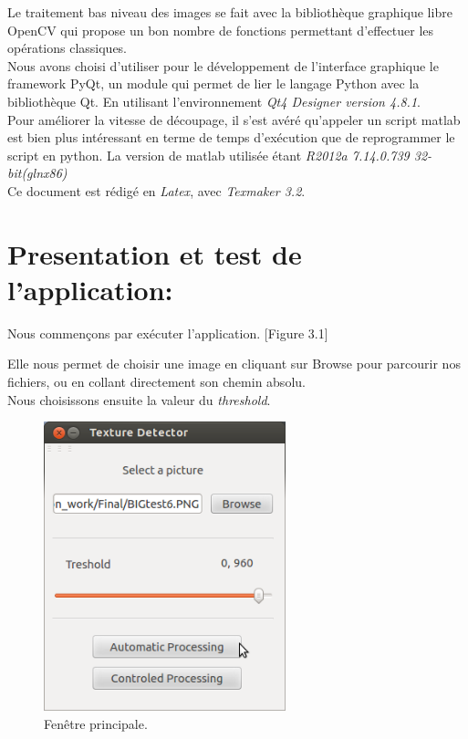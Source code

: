 \indent Le traitement bas niveau des images se fait avec la bibliothèque graphique libre OpenCV qui propose un bon nombre de fonctions permettant d'effectuer les opérations classiques.\\

\indent Nous avons choisi d'utiliser pour le développement de l'interface graphique le framework PyQt, un module qui permet de lier le langage Python avec la bibliothèque Qt. En utilisant l'environnement \textit{Qt4 Designer version 4.8.1}.\\

Pour améliorer la vitesse de découpage, il s'est avéré qu'appeler un script matlab est bien plus intéressant en terme de temps d’exécution que de reprogrammer le script en python. La version de matlab utilisée étant \textit{R2012a 7.14.0.739 32-bit(glnx86)} \\

Ce document est rédigé en \textit{Latex}, avec \textit{Texmaker 3.2}.

\section{Presentation et test de l'application:}

Nous commençons par exécuter l'application. [Figure 3.1]

Elle nous permet de choisir une image en cliquant sur Browse pour parcourir nos fichiers, ou en collant directement son chemin absolu.\\
Nous choisissons ensuite la valeur du \textit{threshold}.

\begin{figure}[H]
	\centering
		\includegraphics[width=7cm,]{Figures/chap3/3.png}
			\caption[choice1]{Fenêtre principale.}
	\label{fig:choice1}
\end{figure}

